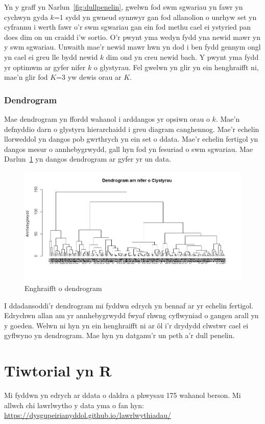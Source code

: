 Yn y graff yn Narlun~\ref{fig:dullpenelin}, gwelwn fod swm sgwariau yn fawr yn cychwyn gyda $k$=1 sydd yn gwneud synnwyr gan fod allanolion o unrhyw set yn cyfrannu i werth fawr o'r swm sgwariau gan ein fod methu cael ei ystyried pan does dim on un craidd i'w sortio.
O'r pwynt yma wedyn fydd yna newid mawr yn y swm sgwariau. Unwaith mae'r newid mawr hwn yn dod i ben fydd gennym ongl yn cael ei greu lle bydd newid $k$ dim ond yn creu newid bach. Y pwynt yma fydd yr optimwm ar gyfer nifer $k$ o glystyrau. Fel gwelwn yn glir yn ein henghraifft ni, mae'n glir fod $K$=3 yw dewis orau ar $K$.

\subsubsection{Dendrogram}

Mae dendrogram yn ffordd wahanol i arddangos yr opsiwn orau o $k$. Mae'n defnyddio darn o glystyru hierarchaidd i greu diagram canghennog. Mae'r echelin llorweddol yn dangos pob gwrthrych yn ein set o ddata. Mae'r echelin fertigol yn dangos mesur o annhebygrwydd, gall hyn fod yn fesuriad o swm sgwariau. Mae Darlun~\ref{fig:dendogram} yn dangos dendrogram ar gyfer yr un data.

\begin{figure}[H]
\begin{center}
\includegraphics[width=0.5\linewidth]{../img/Dendrogram.jpeg}
\end{center}
\caption{Enghraifft o dendrogram}
\label{fig:dendogram}
\end{figure}

I ddadansoddi'r dendrogram mi fyddwn edrych yn bennaf ar yr echelin fertigol. Edrychwn allan am yr annhebygrwydd fwyaf rhwng cyflwyniad o gangen arall yn y goeden. Welwn ni hyn yn ein henghraifft ni ar ôl i'r drydydd clwstwr cael ei gyflwyno yn dendrogram. Mae hyn yn datganu'r un peth a'r dull penelin.

\section{Tiwtorial yn R}
Mi fyddwn yn edrych ar ddata o daldra a phwysau 175 wahanol berson. Mi allwch chi lawrlwytho y data yma o fan hyn: \url{https://dysgupeirianyddol.github.io/lawrlwythiadau/}

